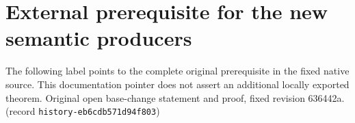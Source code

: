 \section{External prerequisite for the new semantic producers}
\label{sec:phase4-external-prerequisites-20261021}
The following label points to the complete original prerequisite in the fixed native source. This documentation pointer does not assert an additional locally exported theorem.
\label{hir:base-change-open}
Original open base-change statement and proof, fixed revision 636442a. (record \texttt{history-eb6cdb571d94f803})
